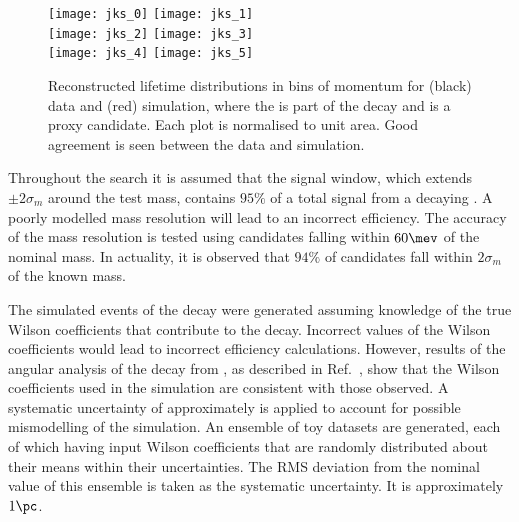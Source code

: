 \begin{figure}
  \begin{center}
    \texttt{[image: jks\_0]}
    \texttt{[image: jks\_1]}\\
    \texttt{[image: jks\_2]}
    \texttt{[image: jks\_3]}\\
    \texttt{[image: jks\_4]}
    \texttt{[image: jks\_5]}
    \caption[Validation of efficiency ratio at long lifetimes]
    {
      Reconstructed \KS lifetime distributions in bins of \KS momentum for (black) data and
      (red) simulation, where the \KS is part of the decay \decay{\Bd}{\jpsi\KS(\to\pipi)} and is a
      proxy \db candidate.
      Each plot is normalised to unit area.
      Good agreement is seen between the data and simulation.
    }
    \label{fig:db:syst:effrat}
  \end{center}
\end{figure}


Throughout the search it is assumed that the signal window, which extends $\pm2\sigma_m$ around
the test mass, contains $95\%$ of a total signal from a decaying \db.
A poorly modelled mass resolution will lead to an incorrect efficiency.
The accuracy of the mass resolution is tested using \btojpsikstr candidates falling within $60\mev$
of the nominal \Bd mass.
In actuality, it is observed that $94\%$ of \jpsitomumu candidates fall within $2\sigma_m$ of
the known \jpsi mass.


The simulated events of the \sm decay \btokstrmumu were generated
assuming knowledge of the true Wilson coefficients that contribute to the decay.
Incorrect values of the Wilson coefficients would lead to incorrect efficiency calculations.
However, results of the angular analysis of the decay \btokstrmumu from \lhcb, as described in
Ref.~\cite{LHCb-CONF-2015-002}, show that the Wilson coefficients used in the simulation are
consistent with those observed.
A systematic uncertainty of approximately is applied to account for possible mismodelling of the \sm
simulation.
An ensemble of toy datasets are generated, each of which having input Wilson coefficients that are
randomly distributed about their means within their uncertainties.
The RMS deviation from the nominal value of this ensemble is taken as the systematic uncertainty.
It is approximately $1\pc$.


